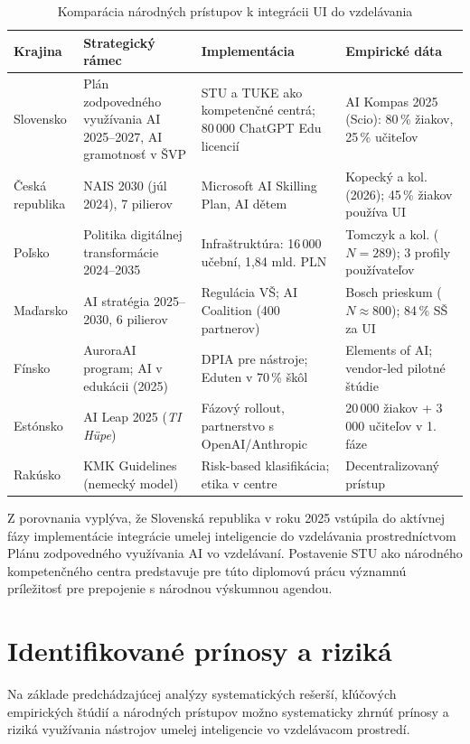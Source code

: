 \begin{table}[H]
\centering
\caption{Komparácia národných prístupov k integrácii UI do vzdelávania}
\label{tab:krajiny}
\footnotesize
\begin{tabularx}{\textwidth}{|p{1.9cm}|X|X|X|}
\hline
\textbf{Krajina} & \textbf{Strategický rámec} & \textbf{Implementácia} & \textbf{Empirické dáta} \\
\hline
Slovensko & Plán zodpovedného využívania AI 2025--2027, AI gramotnosť v ŠVP & STU a TUKE ako kompetenčné centrá; 80\,000 ChatGPT Edu licencií & AI Kompas 2025 (Scio): 80\,\% žiakov, 25\,\% učiteľov \\
\hline
Česká republika & NAIS 2030 (júl 2024), 7 pilierov & Microsoft AI Skilling Plan, AI dětem & Kopecký a kol. (2026); 45\,\% žiakov používa UI \\
\hline
Poľsko & Politika digitálnej transformácie 2024--2035 & Infraštruktúra: 16\,000 učební, 1,84 mld. PLN & Tomczyk a kol. ($N{=}289$); 3 profily používateľov \\
\hline
Maďarsko & AI stratégia 2025--2030, 6 pilierov & Regulácia VŠ; AI Coalition (400 partnerov) & Bosch prieskum ($N{\approx}800$); 84\,\% SŠ za UI \\
\hline
Fínsko & AuroraAI program; AI v edukácii (2025) & DPIA pre nástroje; Eduten v 70\,\% škôl & Elements of AI; vendor-led pilotné štúdie \\
\hline
Estónsko & AI Leap 2025 (\textit{TI Hüpe}) & Fázový rollout, partnerstvo s OpenAI/Anthropic & 20\,000 žiakov + 3\,000 učiteľov v 1. fáze \\
\hline
Rakúsko & KMK Guidelines (nemecký model) & Risk-based klasifikácia; etika v centre & Decentralizovaný prístup \\
\hline
\end{tabularx}
\end{table}

Z porovnania vyplýva, že Slovenská republika v roku 2025 vstúpila do aktívnej fázy implementácie integrácie umelej inteligencie do vzdelávania prostredníctvom Plánu zodpovedného využívania AI vo vzdelávaní. Postavenie STU ako národného kompetenčného centra predstavuje pre túto diplomovú prácu významnú príležitosť pre prepojenie s národnou výskumnou agendou.


\section{Identifikované prínosy a riziká}
\label{sec:prinosy}

Na základe predchádzajúcej analýzy systematických rešerší, kľúčových empirických štúdií a národných prístupov možno systematicky zhrnúť prínosy a riziká využívania nástrojov umelej inteligencie vo vzdelávacom prostredí.


